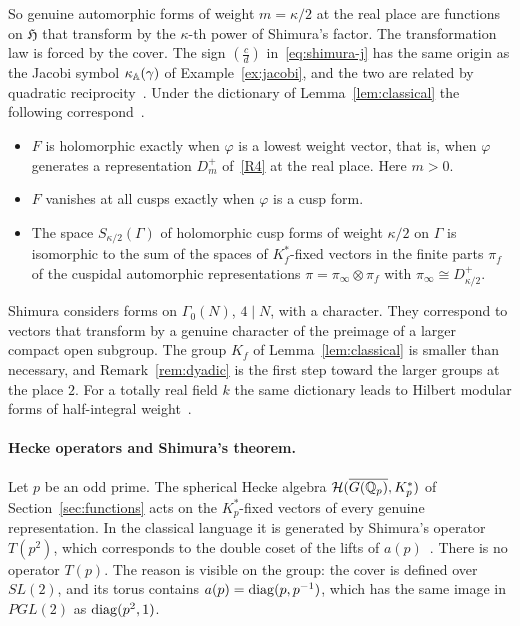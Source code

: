 So genuine automorphic forms of weight $m=\kappa/2$ at the real place
are functions on $\mathfrak H$ that transform by the $\kappa$-th power
of Shimura's factor. The transformation law is forced by the cover. The
sign $(\frac cd)$ in~\eqref{eq:shimura-j} has the same origin as the
Jacobi symbol $\kappa_{\mathbb{A}}(\gamma)$ of Example~\ref{ex:jacobi}, and the two
are related by quadratic reciprocity~\cite{Ge76}. Under the dictionary of
Lemma~\ref{lem:classical} the following correspond~\cite{Ge76,Wa81}.
\begin{itemize}
\item $F$ is holomorphic exactly when $\varphi$ is a lowest weight
  vector, that is, when $\varphi$ generates a representation $D^+_m$
  of~\ref{R4} at the real place. Here $m>0$.
\item $F$ vanishes at all cusps exactly when $\varphi$ is a cusp form.
\item The space $S_{\kappa/2}(\Gamma)$ of holomorphic cusp forms of weight
  $\kappa/2$ on $\Gamma$ is isomorphic to the sum of the spaces of
  $K_f^*$-fixed vectors in the finite parts $\pi_f$ of the cuspidal
  automorphic representations $\pi=\pi_\infty\otimes\pi_f$ with
  $\pi_\infty\cong D^+_{\kappa/2}$.
\end{itemize}
Shimura considers forms on $\Gamma_0(N)$, $4\mid N$, with a character.
They
correspond to vectors that transform by a genuine character of the
preimage of a larger compact open subgroup. The group $K_f$ of
Lemma~\ref{lem:classical} is smaller than necessary, and
Remark~\ref{rem:dyadic} is the first step toward the larger groups at
the place $2$. For a totally real field $k$ the same dictionary leads to
Hilbert modular forms of half-integral weight~\cite{HI13}.

\paragraph{Hecke operators and Shimura's theorem.} Let $p$ be an odd
prime. The spherical Hecke algebra $\mathcal H(\overline{G(\mathbb{Q}_p)},K_p^*)$
of Section~\ref{sec:functions} acts on the $K_p^*$-fixed vectors of every
genuine representation. In the classical language it is generated by
Shimura's operator $T(p^2)$, which corresponds to the double coset of the
lifts of $a(p)$~\cite{Sh73,Ge76}. There is no operator $T(p)$. The reason
is visible on the group: the cover is defined over $SL(2)$, and its
torus contains $a(p)=\operatorname{diag}(p,p^{-1})$, which has the same image in
$PGL(2)$ as $\operatorname{diag}(p^2,1)$.

